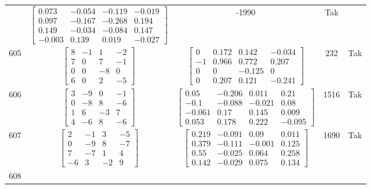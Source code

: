 \documentclass[a4paper,12pt]{article}
\begin{document}
\begin{tabular}{c c c c c}
&
$\begin{bmatrix} 0.073 & -0.054 & -0.119 & -0.019 \\ 0.097 & -0.167 & -0.268 & 0.194 \\ 0.149 & -0.034 & -0.084 & 0.147 \\ -0.003 & 0.139 & 0.019 & -0.027 \end{bmatrix}$
&
-1990
&
Tak
\\
605
&
$\begin{bmatrix} 8 & -1 & 1 & -2 \\ 7 & 0 & 7 & -1 \\ 0 & 0 & -8 & 0 \\ 6 & 0 & 2 & -5 \end{bmatrix}$
&
$\begin{bmatrix} 0 & 0.172 & 0.142 & -0.034 \\ -1 & 0.966 & 0.772 & 0.207 \\ 0 & 0 & -0.125 & 0 \\ 0 & 0.207 & 0.121 & -0.241 \end{bmatrix}$
&
232
&
Tak
\\
606
&
$\begin{bmatrix} 3 & -9 & 0 & -1 \\ 0 & -8 & 8 & -6 \\ 1 & 6 & -3 & 7 \\ 4 & -6 & 8 & -6 \end{bmatrix}$
&
$\begin{bmatrix} 0.05 & -0.206 & 0.011 & 0.21 \\ -0.1 & -0.088 & -0.021 & 0.08 \\ -0.061 & 0.17 & 0.145 & 0.009 \\ 0.053 & 0.178 & 0.222 & -0.095 \end{bmatrix}$
&
1516
&
Tak
\\
607
&
$\begin{bmatrix} 2 & -1 & 3 & -5 \\ 0 & -9 & 8 & -7 \\ 7 & -7 & 1 & 4 \\ -6 & 3 & -2 & 9 \end{bmatrix}$
&
$\begin{bmatrix} 0.219 & -0.091 & 0.09 & 0.011 \\ 0.379 & -0.111 & -0.001 & 0.125 \\ 0.55 & -0.025 & 0.064 & 0.258 \\ 0.142 & -0.029 & 0.075 & 0.134 \end{bmatrix}$
&
1690
&
Tak
\\
608

\end{tabular}
\end{document}
